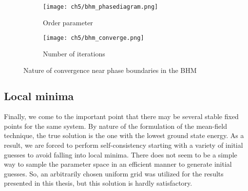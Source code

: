 \begin{figure}[!htb]
    \centering
    \begin{subfigure}[b]{0.45\textwidth}  %
        \centering
        \texttt{[image: ch5/bhm\_phasediagram.png]}
        \caption{Order parameter}
    \end{subfigure}
    \hspace{1em}  %
    \begin{subfigure}[b]{0.45\textwidth}
        \centering
        \texttt{[image: ch5/bhm\_converge.png]}
        \caption{Number of iterations}
    \end{subfigure}
    \caption{Nature of convergence near phase boundaries in the BHM}
    \label{fig:converge_boundary}
\end{figure}
\FloatBarrier \!\!\!\!\!\!\!\!\!\!\!

\subsection{Local minima}
Finally, we come to the important point that there may be several stable fixed points for the same system. By nature of the formulation of the mean-field technique, the true solution is the one with the lowest ground state energy. As a result, we are forced to perform self-consistency starting with a variety of initial guesses to avoid falling into local minima. There does not seem to be a simple way to sample the parameter space in an efficient manner to generate initial guesses. So, an arbitrarily chosen uniform grid was utilized for the results presented in this thesis, but this solution is hardly satisfactory.